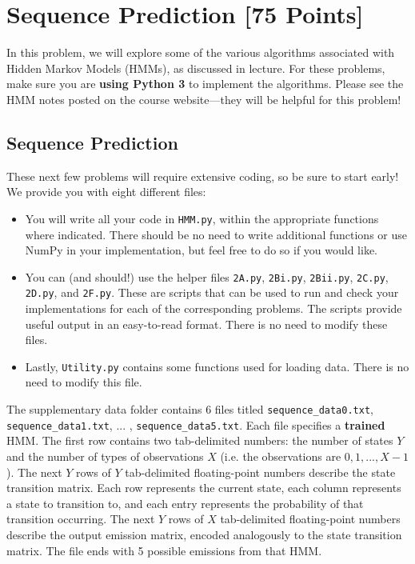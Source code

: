 \begin{solution}
\end{solution}


\newpage
\section{Sequence Prediction [75 Points]}

In this problem, we will explore some of the various algorithms associated with Hidden Markov Models (HMMs), as discussed in lecture.  For these problems, make sure you are \textbf{using Python 3} to implement the algorithms. Please see the HMM notes posted on the course website---they will be helpful for this problem!

\subsection{Sequence Prediction}

These next few problems will require extensive coding, so be sure to start early! We provide you with eight different files:
\begin{itemize}
  \item You will write all your code in \texttt{HMM.py}, within the appropriate functions where indicated. There should be no need to write additional functions or use NumPy in your implementation, but feel free to do so if you would like.
  \item You can (and should!) use the helper files \texttt{2A.py}, \texttt{2Bi.py}, \texttt{2Bii.py}, \texttt{2C.py}, \texttt{2D.py}, and \texttt{2F.py}. These are scripts that can be used to run and check your implementations for each of the corresponding problems. The scripts provide useful output in an easy-to-read format. There is no need to modify these files.
  \item Lastly, \texttt{Utility.py} contains some functions used for loading data. There is no need to modify this file. \\
\end{itemize}

The supplementary data folder contains 6 files titled \texttt{sequence_data0.txt}, \texttt{sequence_data1.txt}, ... , \texttt{sequence_data5.txt}. Each file specifies a \textbf{trained} HMM. The first row contains two tab-delimited numbers: the number of states $Y$ and the number of types of observations $X$ (i.e. the observations are $0, 1, . . . , X - 1$). The next $Y$ rows of $Y$ tab-delimited floating-point numbers describe the state transition matrix. Each row represents the current state, each column represents a state to transition to, and each entry represents the probability of that transition occurring. The next $Y$ rows of $X$ tab-delimited floating-point numbers describe the output emission matrix, encoded analogously to the state transition matrix. The file ends with 5 possible emissions from that HMM. \\

